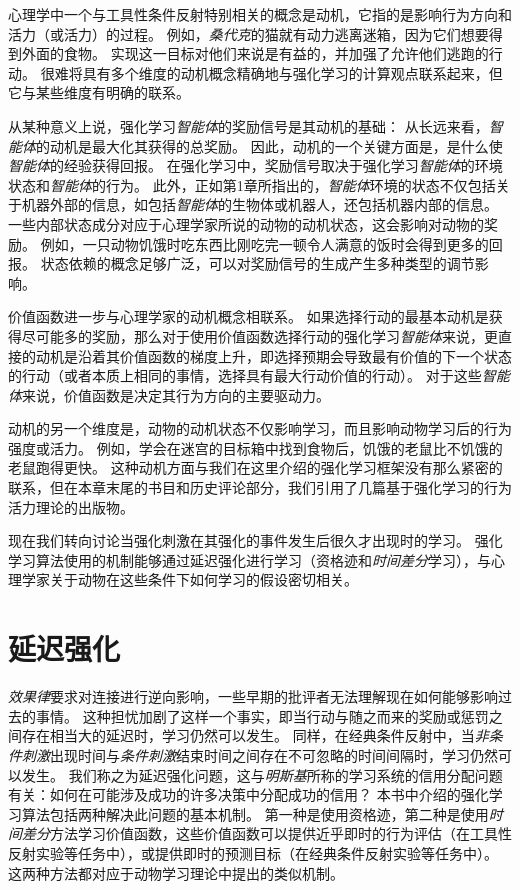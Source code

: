 心理学中一个与工具性条件反射特别相关的概念是动机，它指的是影响行为方向和活力（或活力）的过程。
例如，\textit{桑代克}的猫就有动力逃离迷箱，因为它们想要得到外面的食物。
实现这一目标对他们来说是有益的，并加强了允许他们逃跑的行动。
很难将具有多个维度的动机概念精确地与强化学习的计算观点联系起来，但它与某些维度有明确的联系。


从某种意义上说，强化学习\textit{智能体}的奖励信号是其动机的基础：
从长远来看，\textit{智能体}的动机是最大化其获得的总奖励。
因此，动机的一个关键方面是，是什么使\textit{智能体}的经验获得回报。
在强化学习中，奖励信号取决于强化学习\textit{智能体}的环境状态和\textit{智能体}的行为。
此外，正如第1章所指出的，\textit{智能体}环境的状态不仅包括关于机器外部的信息，如包括\textit{智能体}的生物体或机器人，还包括机器内部的信息。
一些内部状态成分对应于心理学家所说的动物的动机状态，这会影响对动物的奖励。
例如，一只动物饥饿时吃东西比刚吃完一顿令人满意的饭时会得到更多的回报。
状态依赖的概念足够广泛，可以对奖励信号的生成产生多种类型的调节影响。


价值函数进一步与心理学家的动机概念相联系。
如果选择行动的最基本动机是获得尽可能多的奖励，那么对于使用价值函数选择行动的强化学习\textit{智能体}来说，更直接的动机是沿着其价值函数的梯度上升，即选择预期会导致最有价值的下一个状态的行动（或者本质上相同的事情，选择具有最大行动价值的行动）。
对于这些\textit{智能体}来说，价值函数是决定其行为方向的主要驱动力。


动机的另一个维度是，动物的动机状态不仅影响学习，而且影响动物学习后的行为强度或活力。
例如，学会在迷宫的目标箱中找到食物后，饥饿的老鼠比不饥饿的老鼠跑得更快。
这种动机方面与我们在这里介绍的强化学习框架没有那么紧密的联系，但在本章末尾的书目和历史评论部分，我们引用了几篇基于强化学习的行为活力理论的出版物。


现在我们转向讨论当强化刺激在其强化的事件发生后很久才出现时的学习。
强化学习算法使用的机制能够通过延迟强化进行学习（资格迹和\textit{时间差分}学习），与心理学家关于动物在这些条件下如何学习的假设密切相关。


\section{延迟强化} \label{sec:delayed_reinforcement}


\textit{效果律}要求对连接进行逆向影响，一些早期的批评者无法理解现在如何能够影响过去的事情。
这种担忧加剧了这样一个事实，即当行动与随之而来的奖励或惩罚之间存在相当大的延迟时，学习仍然可以发生。
同样，在经典条件反射中，当\textit{非条件刺激}出现时间与\textit{条件刺激}结束时间之间存在不可忽略的时间间隔时，学习仍然可以发生。
我们称之为延迟强化问题，这与\textit{明斯基}\cite{minsky1961steps}所称的学习系统的信用分配问题有关：如何在可能涉及成功的许多决策中分配成功的信用？
本书中介绍的强化学习算法包括两种解决此问题的基本机制。
第一种是使用资格迹，第二种是使用\textit{时间差分}方法学习价值函数，这些价值函数可以提供近乎即时的行为评估（在工具性反射实验等任务中），或提供即时的预测目标（在经典条件反射实验等任务中）。
这两种方法都对应于动物学习理论中提出的类似机制。


